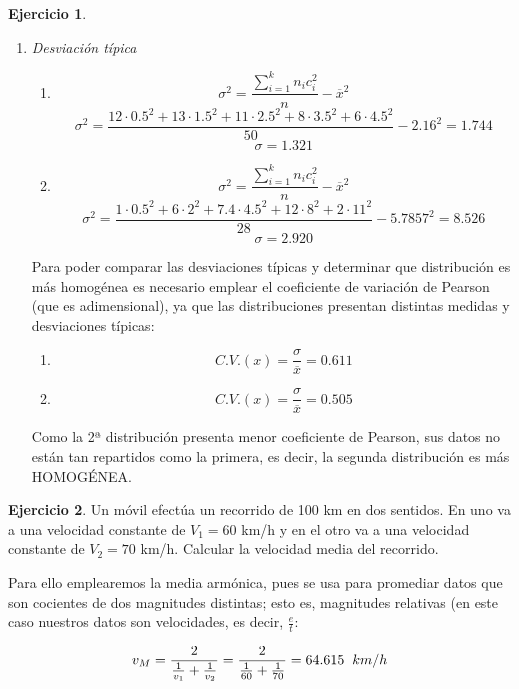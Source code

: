 \documentclass[a4paper, 12pt]{article}
\theoremstyle{definition}
\newtheorem{ej}{Ejercicio}
\begin{document}
\begin{ej}
\begin{enumerate}[label=\textit{\alph*)}]
\begin{enumerate}[label=\arabic*)]
    \item \textit{Desviación típica}
    
    \begin{enumerate}[label=(\arabic*)]
        \item 
        \[
            \sigma^2 = \frac{\sum_{i=1}^{k}n_ic_i^2}{n} - \overline{x}^2  
        \]
        \[
        \sigma^2 = \frac{12 \cdot 0.5^2 + 13 \cdot 1.5^2 + 11 \cdot 2.5^2 + 8 \cdot 3.5^2 + 6 \cdot 4.5^2}{50} - 2.16^2 = 1.744
        \]
        \[
        \sigma = 1.321
        \]
        
        \item
        \[
            \sigma^2 = \frac{\sum_{i=1}^{k}n_ic_i^2}{n} - \overline{x}^2  
        \]
        \[
        \sigma^2 = \frac{1 \cdot 0.5^2 + 6 \cdot 2^2 + 7.4 \cdot 4.5^2 + 12 \cdot 8^2 + 2 \cdot 11^2}{28} - 5.7857^2 = 8.526
        \]
        \[
        \sigma = 2.920
        \]
    \end{enumerate}
    
    Para poder comparar las desviaciones típicas y determinar que distribución es más homogénea es necesario emplear el coeficiente de variación de Pearson (que es adimensional), ya que las distribuciones presentan distintas medidas y desviaciones típicas:
    \begin{enumerate}[label=(\arabic*)]
        \item 
        \[
        C.V.(x) = \frac{\sigma}{\overline{x}} = 0.611
        \]
        \item
        \[
        C.V.(x) = \frac{\sigma}{\overline{x}} = 0.505
        \]
    \end{enumerate}
    
         Como la 2ª distribución presenta menor coeficiente de Pearson, sus datos no están tan repartidos como la primera, es decir, la segunda distribución es más HOMOGÉNEA.
     \end{enumerate}
    
\end{enumerate}
\end{ej}

\begin{ej}
Un móvil efectúa un recorrido de 100 km en dos sentidos. En uno va a una velocidad constante de \(V_1 = 60\) km/h y en el otro va a una velocidad constante de \(V_2 = 70\) km/h. Calcular la velocidad media del recorrido. 
\newline

Para ello emplearemos la media armónica, pues se usa para promediar datos que son cocientes de dos magnitudes distintas; esto es, magnitudes relativas (en este caso nuestros datos son velocidades, es decir, \(\frac{e}{t}\):

\[
v_M = \frac{2}{\frac{1}{v_1} + \frac{1}{v_2}} = \frac{2}{\frac{1}{60} + \frac{1}{70}} = 64.615 \hspace{0.2cm} km/h
\]
\end{ej}
\end{document}
